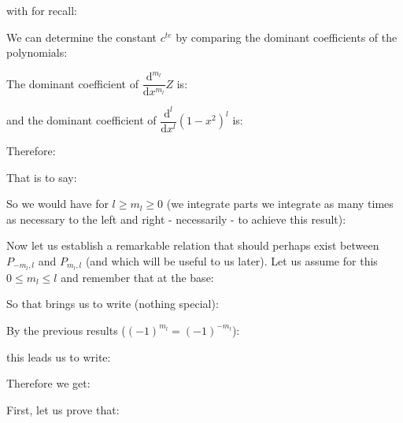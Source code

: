 	with for recall:
	
	We can determine the constant $c^{te}$ by comparing the dominant coefficients of the polynomials:
	
	The dominant coefficient of $\dfrac{\mathrm{d}^{m_l}}{\mathrm{d}x^{m_l}}Z$ is:
	
	and the dominant coefficient of $\dfrac{\mathrm{d}^l}{\mathrm{d}x^l}(1-x^2)^l$ is:
	
	Therefore:
	
	That is to say:
	
	So we would have for $l\geq m_l\geq 0$ (we integrate parts we integrate as many times as necessary to the left and right - necessarily - to achieve this result):
	
	Now let us establish a remarkable relation that should perhaps exist between $P_{-m_l,l}$ and $P_{m_l,l}$ (and which will be useful to us later). Let us assume for this $0\leq m_l\leq l$ and remember that at the base:
	
	So that brings us to write (nothing special):
	
	By the previous results ($(-1)^{m_l}=(-1)^{-m_l}$):
	
	this leads us to write:
	
	Therefore we get:
	
	
	First, let us prove that:
	
